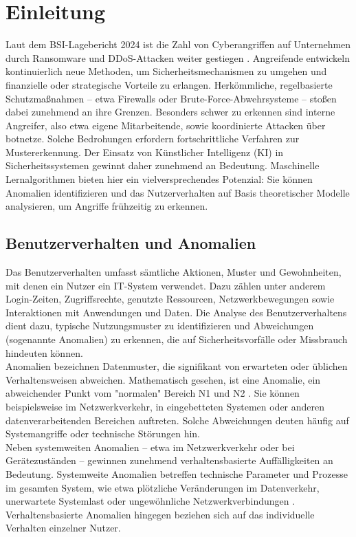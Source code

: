 \documentclass[a4paper,12pt]{article}
\begin{document}
	
	
	\printglossaries 
	\newpage

	\section{Einleitung}
	Laut dem BSI-Lagebericht 2024 ist die Zahl von Cyberangriffen auf Unternehmen durch Ransomware und DDoS-Attacken weiter gestiegen \cite{bsi2024lage}.
	Angreifende entwickeln kontinuierlich neue Methoden, um Sicherheitsmechanismen zu umgehen und finanzielle oder strategische Vorteile zu erlangen. Herkömmliche, regelbasierte Schutzmaßnahmen – etwa Firewalls oder Brute-Force-Abwehrsysteme – stoßen dabei zunehmend an ihre Grenzen.
	Besonders schwer zu erkennen sind interne Angreifer, also etwa eigene Mitarbeitende, sowie koordinierte Attacken über \gls{botnetz}e. Solche Bedrohungen erfordern fortschrittliche Verfahren zur Mustererkennung. Der Einsatz von Künstlicher Intelligenz (KI) in Sicherheitssystemen gewinnt daher zunehmend an Bedeutung. Maschinelle Lernalgorithmen bieten hier ein vielversprechendes Potenzial: Sie können Anomalien identifizieren und das Nutzerverhalten auf Basis theoretischer Modelle analysieren, um Angriffe frühzeitig zu erkennen.
	
	\subsection{Benutzerverhalten und Anomalien}
	
	Das Benutzerverhalten umfasst sämtliche Aktionen, Muster und Gewohnheiten, mit denen ein Nutzer ein IT-System verwendet. Dazu zählen unter anderem Login-Zeiten, Zugriffsrechte, genutzte Ressourcen, Netzwerkbewegungen sowie Interaktionen mit Anwendungen und Daten. Die Analyse des Benutzerverhaltens dient dazu, typische Nutzungsmuster zu identifizieren und Abweichungen (sogenannte Anomalien) zu erkennen, die auf Sicherheitsvorfälle oder Missbrauch hindeuten können.
	\\[0.5em]
	Anomalien bezeichnen Datenmuster, die signifikant von erwarteten oder üblichen Verhaltensweisen abweichen. Mathematisch gesehen, ist eine Anomalie, ein abweichender Punkt vom "normalen" Bereich N1 und N2 \cite{chandola2009anomaly}. Sie können beispielsweise im Netzwerkverkehr, in eingebetteten Systemen oder anderen datenverarbeitenden Bereichen auftreten. Solche Abweichungen deuten häufig auf Systemangriffe oder technische Störungen hin.
	\\[0.5em]
	Neben systemweiten Anomalien – etwa im Netzwerkverkehr oder bei Gerätezuständen – gewinnen zunehmend verhaltensbasierte Auffälligkeiten an Bedeutung.
	Systemweite Anomalien betreffen technische Parameter und Prozesse im gesamten System, wie etwa plötzliche Veränderungen im Datenverkehr, unerwartete Systemlast oder ungewöhnliche Netzwerkverbindungen \cite{chandola2009anomaly}.
	Verhaltensbasierte Anomalien hingegen beziehen sich auf das individuelle Verhalten einzelner Nutzer.
	
\end{document}
